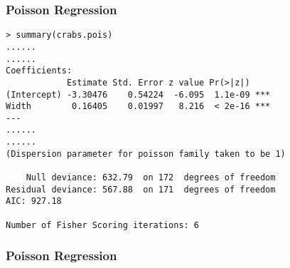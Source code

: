 \documentclass{beamer}
\begin{document}
\begin{frame}[fragile]
\frametitle{Poisson Regression}
\Large

\begin{verbatim}
> summary(crabs.pois)
...... 
......
Coefficients:
            Estimate Std. Error z value Pr(>|z|)    
(Intercept) -3.30476    0.54224  -6.095  1.1e-09 ***
Width        0.16405    0.01997   8.216  < 2e-16 ***
---
...... 
......
(Dispersion parameter for poisson family taken to be 1)

    Null deviance: 632.79  on 172  degrees of freedom
Residual deviance: 567.88  on 171  degrees of freedom
AIC: 927.18

Number of Fisher Scoring iterations: 6
\end{verbatim}


\end{frame}

\begin{frame}[fragile]
\frametitle{Poisson Regression}
\Large


\end{frame}

\end{document}

